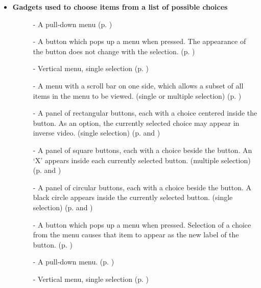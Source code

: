 \begin{itemize}
\item {\bf Gadgets used to choose items from a list of possible choices}
\begin{description}
\item[]  - A pull-down menu (p. \pageref{menubar})

\item[]  - A button which pops up a menu when pressed.  The
appearance of the button does not change with the selection.
(p. \pageref{popup-menu-button})

\item[]  -  Vertical menu, single selection (p. \pageref{menu})

\item[]  -  A menu with a scroll bar on one side, which allows a
subset of all items in the menu to be viewed. (single or multiple selection)
(p. \pageref{scrolling-menu})

\item[]  -  A panel of rectangular buttons, each with a choice
centered inside the button.  As an option, the currently selected choice
may appear in inverse video.  (single selection) (p. \pageref{buttons} and
\pageref{text-buttons})

\item[]  -  A panel of square buttons, each with a choice beside the
button.  An `X' appears inside each currently selected button.  (multiple
selection)  (p. \pageref{buttons} and \pageref{x-buttons})

\item[]  -  A panel of circular buttons, each with a choice beside
the button.  A black circle appears inside the currently selected button.
(single selection)  (p. \pageref{buttons} and \pageref{radio-buttons})

\item[]  - A button which pops up a menu when pressed.  Selection of
a choice from the menu causes that item to appear as the new label of the
button.  (p. \pageref{option-button})

\item[]  - A pull-down menu.  (p. \pageref{motif-menubar})

\item[]  - Vertical menu, single selection  (p. \pageref{motif-menu})


\end{description}
\end{itemize}
